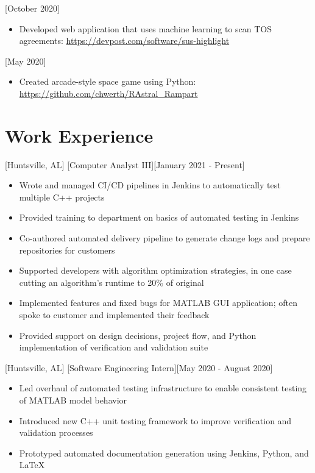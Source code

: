 \documentclass[hidelinks, 11pt]{article}
\newcommand{\link}[1]{{\color{blue}\href{#1}{#1}}}
\begin{document}
[October 2020]

\begin{itemize}
  \item Developed web application that uses machine learning to scan TOS agreements: \link{https://devpost.com/software/sus-highlight}
\end{itemize}

[May 2020]

\begin{itemize}
  \item Created arcade-style space game using Python: \link{https://github.com/chwerth/RAstral\_Rampart}
\end{itemize}

\section{Work Experience}

[Huntsville, AL]
[Computer Analyst III][January 2021 - Present]

\begin{itemize}
  \item Wrote and managed CI/CD pipelines in Jenkins to automatically test multiple C++ projects
  \item Provided training to department on basics of automated testing in Jenkins
  \item Co-authored automated delivery pipeline to generate change logs and prepare repositories for customers
  \item Supported developers with algorithm optimization strategies, in one case cutting an algorithm's runtime to 20\% of original
  \item Implemented features and fixed bugs for MATLAB GUI application; often spoke to customer and implemented their feedback
  \item Provided support on design decisions, project flow, and Python implementation of verification and validation suite
\end{itemize}

[Huntsville, AL]
[Software Engineering Intern][May 2020 - August 2020]

\begin{itemize}
  \item Led overhaul of automated testing infrastructure to enable consistent testing of MATLAB model behavior
  \item Introduced new C++ unit testing framework to improve verification and validation processes
  \item Prototyped automated documentation generation using Jenkins, Python, and LaTeX
\end{itemize}
\end{document}
